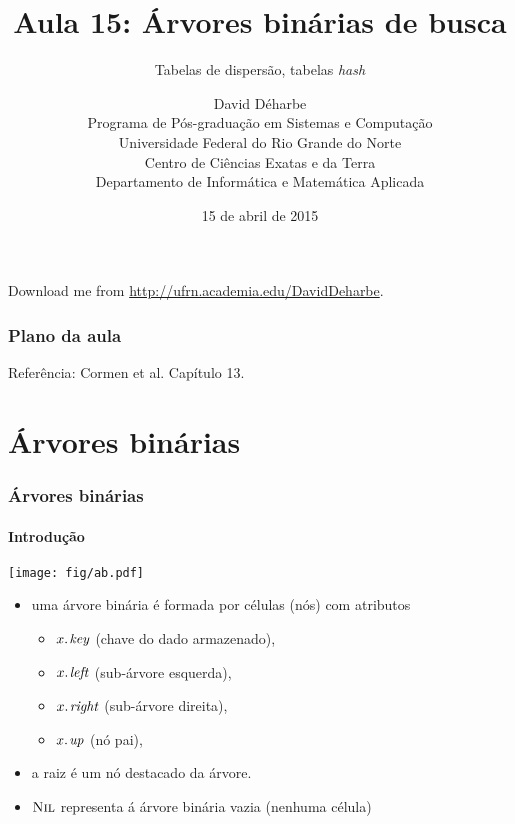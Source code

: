\documentclass{beamer}
\title{Aula 15: Árvores binárias de busca}
\subtitle{Tabelas de dispersão, tabelas \textit{hash\/}}
\author{David Déharbe \\
  Programa de Pós-graduação em Sistemas e Computação \\
  Universidade Federal do Rio Grande do Norte \\
  Centro de Ciências Exatas e da Terra \\
  Departamento de Informática e Matemática Aplicada}
\date{15 de abril de 2015}
\begin{document}
\begin{frame}
  \titlepage
  Download me from \url{http://ufrn.academia.edu/DavidDeharbe}.
\end{frame}

\begin{frame}
  \frametitle{Plano da aula}
  \tableofcontents

  \alert{Referência}: Cormen et al. Capítulo 13.
\end{frame}

\section{Árvores binárias}

\begin{frame}

  \frametitle{Árvores binárias}
  \framesubtitle{Introdução}

  \begin{center}
    \texttt{[image: fig/ab.pdf]}
  \end{center}
  \begin{itemize}
    
  \item uma \alert{árvore binária} é formada por células (\alert{nós})
    com atributos
          
    \begin{itemize}

    \item $\attrib{x}{key}$ (chave do dado armazenado),

    \item $\attrib{x}{left}$ (sub-árvore esquerda),
      
    \item $\attrib{x}{right}$  (sub-árvore direita),
      
    \item $\attrib{x}{up}$ (nó pai),

    \end{itemize}

  \item a \alert{raiz} é um nó destacado da árvore.

  \item $\textnormal{\scshape Nil}$ representa á árvore binária vazia (nenhuma célula)

  \end{itemize}

\end{frame}
\end{document}
